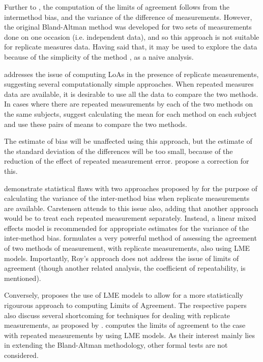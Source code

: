 \documentclass[12pt, a4paper]{report}
\theoremstyle{plain}
\theoremstyle{definition}
\theoremstyle{remark}
\begin{document}
Further to \citet{BA86}, the computation of the limits of agreement follows from the intermethod bias, and the variance of the difference of measurements. However, the original Bland-Altman method was developed for two sets of measurements done on one occasion (i.e. independent data), and so this approach is not suitable for replicate measures data. Having said that, it may be used to explore the data because of the simplicity of the method , as a naive analysis.

\citet{BA99} addresses the issue of computing LoAs in the presence of replicate measurements, suggesting several computationally simple approaches. When repeated measures data are available, it is desirable to use all the data to compare the two methods. In cases where there are repeated measurements by each of the two methods on the same subjects, \citet{BA99} suggest calculating
the mean for each method on each subject and use these pairs of means to compare the two methods.

The estimate of bias will be unaffected using this approach, but the estimate of the standard deviation of the differences will be too small, because of the reduction of the effect of repeated measurement error. \citet{BA99} propose a correction for this.


\citet{BXC2008} demonstrate statistical flaws with two approaches proposed by \citet{BA99} for the purpose of calculating the variance of the inter-method bias when replicate measurements are available. Carstensen attends to this issue also, adding that another approach would be to treat each repeated measurement separately. Instead, a linear mixed effects model is recommended for appropriate estimates for the variance of the inter-method bias. 
\citet{ARoy2009} formulates a very powerful method of assessing the agreement of two methods of measurement, with replicate measurements, also using LME models. Importantly, Roy's approach does not address the issue of limits of agreement (though another related analysis, the coefficient of repeatability, is mentioned).

Conversely, \citet{BXC2008} proposes the use of LME models to allow for a more statistically rigourous approach to computing Limits of Agreement.  The respective papers also discuss several shortcoming for techniques for dealing with replicate measurements, as proposed by \citet{BA99}. \citet{BXC2008} computes the limits of agreement to the case with repeated measurements by using LME models. As their interest mainly lies in extending the Bland-Altman methodology, other formal tests are not considered.
\end{document}
